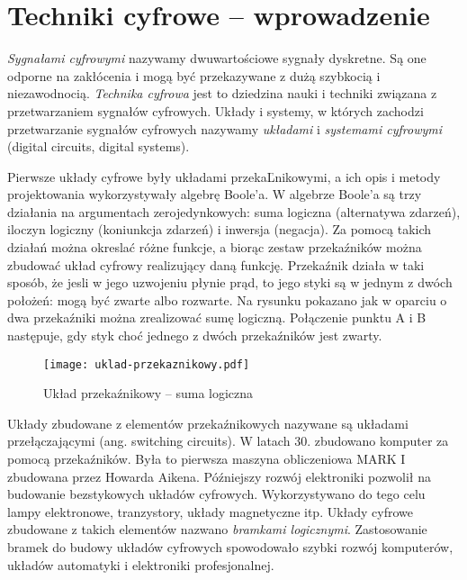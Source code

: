 \documentclass[a4paper,11pt]{article}
\begin{document}
 
\section*{Techniki cyfrowe -- wprowadzenie}
\emph{Sygnałami cyfrowymi} nazywamy dwuwartościowe sygnały dyskretne. Są one odporne na zakłócenia i mogą być przekazywane z dużą szybkocią i niezawodnocią. \emph{Technika cyfrowa} jest to dziedzina nauki i techniki związana z przetwarzaniem sygnałów cyfrowych. Układy i systemy, w których zachodzi przetwarzanie sygnałów cyfrowych nazywamy \emph{układami} i \emph{systemami cyfrowymi} (digital circuits, digital systems).

  Pierwsze układy cyfrowe były układami przekaĽnikowymi, a ich opis i metody projektowania wykorzystywały algebrę Boole'a. W algebrze Boole'a są trzy działania na argumentach zerojedynkowych: suma logiczna (alternatywa zdarzeń), iloczyn logiczny (koniunkcja zdarzeń) i inwersja (negacja). Za pomocą takich działań można okreslać różne funkcje, a biorąc zestaw przekaźników można zbudować układ cyfrowy realizujący daną funkcję. Przekaźnik działa w taki sposób, że jesli w jego uzwojeniu płynie prąd, to jego styki są w jednym z dwóch położeń: mogą być zwarte albo rozwarte. Na rysunku pokazano jak w oparciu o dwa przekaźniki można zrealizować sumę logiczną. Połączenie punktu A i B następuje, gdy styk choć jednego z dwóch przekaźników jest zwarty.
 
\begin{figure}[!htb]
\centerline{\texttt{[image: uklad-przekaznikowy.pdf]}}
\caption{Układ przekaźnikowy -- suma logiczna}
\label{fig:ukladPrzekaznikowy}
\end{figure}
Układy zbudowane z elementów przekaźnikowych nazywane są układami przełączającymi (ang. switching circuits).  W latach 30. zbudowano komputer za pomocą przekaźników. Była to pierwsza maszyna obliczeniowa MARK I zbudowana przez Howarda Aikena. Późniejszy rozwój elektroniki pozwolił na budowanie bezstykowych układów cyfrowych. Wykorzystywano do tego celu lampy elektronowe, tranzystory, układy magnetyczne itp. Układy cyfrowe zbudowane z takich elementów nazwano \emph{bramkami logicznymi}. Zastosowanie bramek do budowy układów cyfrowych spowodowało szybki rozwój komputerów, układów automatyki i elektroniki profesjonalnej.
\end{document}

